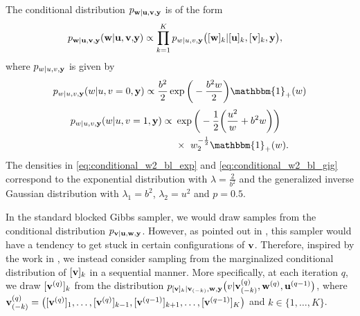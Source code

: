 \documentclass[journal]{IEEEtran}
\begin{document}
The conditional distribution $p_{{\bf{w}} | {\bf{u}}, {\bf{v}}, {\bf{y}}}$ is of the form
\begin{align}
    p_{{\bf{w}} | {\bf{u}}, {\bf{v}}, {\bf{y}}}({\bf{w}} | {\bf{u}}, {\bf{v}}, &{\bf{y}}) \propto \prod_{k=1}^{K} p_{w|u, v, {\bf{y}}}\big([{\bf{w}}]_k|[{\bf{u}}]_k, [{\bf{v}}]_k, {\bf{y}} \big),
\end{align}
where $p_{w|u, v, {\bf{y}}}$ is given by
\begin{equation}\label{eq:conditional_w2_bl_exp}
    p_{w|u, v, \M y}(w|u, v=0, \M y) \propto \frac{b^2}{2}\exp\bigg(-\frac{b^2 w}{2}\bigg) \mathbbm{1}_{+}(w)
\end{equation}
\begin{align}\label{eq:conditional_w2_bl_gig}
    p_{w|u, v, \M y}(w|u, v=1, \M y) \propto \ &\exp\bigg(-\frac{1}{2}\bigg(\frac{u^2}{w} + b^2 w\bigg)\bigg) \nonumber \\
    &\times \ w_2^{-\frac{1}{2}} \mathbbm{1}_{+}(w).
\end{align}
The densities in \eqref{eq:conditional_w2_bl_exp} and \eqref{eq:conditional_w2_bl_gig} correspond to the exponential distribution with $\lambda = \frac{2}{b^2}$ and the generalized inverse Gaussian distribution with $\lambda_1 = b^2$, $\lambda_2 = u^2$ and $p = 0.5$.

In the standard blocked Gibbs sampler, we would draw samples from the conditional distribution $p_{{\bf{v}} | {\bf{u}}, {\bf{w}}, {\bf{y}}}$. However, as pointed out in \cite{ge2011enhanced}, this sampler would have a tendency to get stuck in certain configurations of ${\bf{v}}$. Therefore, inspired by the work in \cite{ge2011enhanced}, we instead consider sampling from the marginalized conditional distribution of $[{\bf{v}}]_k$ in a sequential manner. More specifically, at each iteration $q$, we draw $[{\bf{v}}^{(q)}]_k$ from the distribution $p_{[{\bf{v}}]_k | {\bf{v}}_{(-k)}, {\bf{w}}, {\bf{y}}}\big(v | {\bf{v}}_{(-k)}^{(q)}, {\bf{w}}^{(q)}, {\bf{u}}^{(q-1)}\big)$, where ${\bf{v}}_{(-k)}^{(q)} = \big([{\bf{v}}^{(q)}]_{1}, \ldots, [{\bf{v}}^{(q)}]_{k-1}, [{\bf{v}}^{(q-1)}]_{k+1}, \ldots, [{\bf{v}}^{(q-1)}]_{K} \big)$ and $k \in \{1, \ldots, K\}$.
\end{document}
